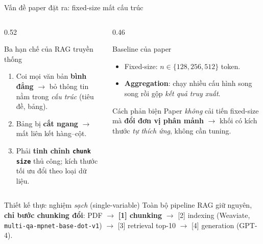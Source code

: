 \documentclass[aspectratio=169,11pt]{beamer}
\begin{document}
\begin{frame}{Vấn đề paper đặt ra: fixed-size mất cấu trúc}
  \begin{columns}[T]
    \begin{column}{0.52\textwidth}
      \begin{alertblock}{\small Ba hạn chế của RAG truyền thống}
        \begin{enumerate}\small
          \item Coi mọi văn bản \textbf{bình đẳng} $\rightarrow$ bỏ thông tin nằm
            trong \emph{cấu trúc} (tiêu đề, bảng).
          \item Bảng bị \textbf{cắt ngang} $\rightarrow$ mất liên kết hàng--cột.
          \item Phải \textbf{tinh chỉnh \texttt{chunk size}} thủ công; kích thước
            tối ưu đổi theo loại dữ liệu.
        \end{enumerate}
      \end{alertblock}
    \end{column}
    \begin{column}{0.46\textwidth}
      \begin{block}{\small Baseline của paper}
        \begin{itemize}\small
          \item Fixed-size: $n \in \{128, 256, 512\}$ token.
          \item \textbf{Aggregation}: chạy nhiều cấu hình song song rồi gộp
            \emph{kết quả truy xuất}.
        \end{itemize}
      \end{block}
      \begin{block}{\small Cách phản biện}
        Paper \emph{không} cải tiến fixed-size mà \textbf{đổi đơn vị phân mảnh}
        $\rightarrow$ khối có kích thước \emph{tự thích ứng}, không cần tuning.
      \end{block}
    \end{column}
  \end{columns}
  \vspace{0.2em}
  \begin{block}{\small Thiết kế thực nghiệm \emph{sạch} (single-variable)}
    \footnotesize Toàn bộ pipeline RAG giữ nguyên, \textbf{chỉ bước chunking đổi}:
    PDF $\rightarrow$ \textbf{[1] chunking} $\rightarrow$ [2] indexing (Weaviate, \texttt{multi-qa-mpnet-base-dot-v1})
    $\rightarrow$ [3] retrieval top-10 $\rightarrow$ [4] generation (GPT-4).
  \end{block}
\end{frame}
\end{document}
